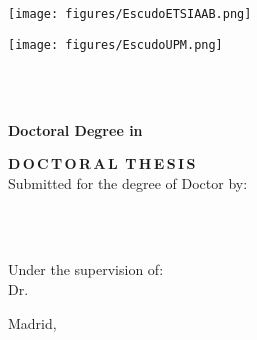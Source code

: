 
\begin{minipage}{0.20\textwidth}
        \texttt{[image: figures/EscudoETSIAAB.png]}
\end{minipage}
\begin{minipage}{0.20\textwidth}
        \texttt{[image: figures/EscudoUPM.png]}
\end{minipage}
\begin{minipage}{0.65\textwidth} \centering
    {\UNIVERSITY}\\
    {\UPMCentre}\\
\end{minipage}

\vspace{15 mm}

\begin{center}
\begin{spacing}{1.5}
\textbf{\large {Doctoral Degree in {\DoctoralProgramme}}}\\
\end{spacing}
\vspace{10 mm}

\begin{spacing}{2.0}
\textbf{\LARGE {\thesisTitle}}
\end{spacing}

\vspace{15 mm}

\begin{spacing}{1.3}
\textbf{\LARGE {D\,O\,C\,T\,O\,R\,A\,L\, T\,H\,E\,S\,I\,S}}\\
\medskip
{\large {Submitted for the degree of Doctor by:}}
\end{spacing}
\end{center}


\begin{center}
\begin{spacing}{1.3}
\textbf{\Large {\thesisAuthor}}\\
{\large {\priorstudies}}\\
\end{spacing}
\end{center}

\vspace{5 mm}
\begin{center}
\begin{spacing}{1.3}
{Under the supervision of:}\\
    {\large {Dr. \supervisor}}\\
    {\large {\cosupervisor}}
\end{spacing}
\end{center}

\vspace{15 mm}
\begin{center}
    \large {Madrid, \thesisDate}
\end{center}

